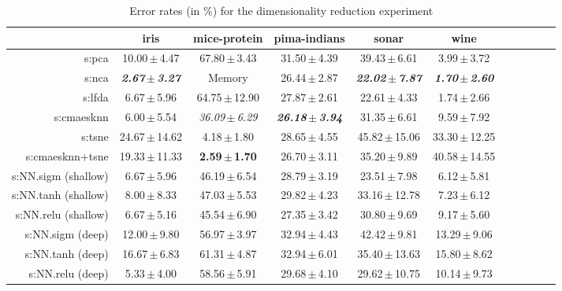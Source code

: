 \begin{table}[ht]
{\begin{tabular}{rcccccccccc}
\midrule
& \multicolumn{1}{c}{iris} & \multicolumn{1}{c}{mice-protein} & \multicolumn{1}{c}{pima-indians} & \multicolumn{1}{c}{sonar} & \multicolumn{1}{c}{wine} \\ 
\midrule
s:\ac{pca} & 10.00\,$\pm$\,4.47 & 67.80\,$\pm$\,3.43 & 31.50\,$\pm$\,4.39 & 39.43\,$\pm$\,6.61 & 3.99\,$\pm$\,3.72 \\
s:\ac{nca} & \emph{\textbf{2.67\,$\pm$\,3.27}} & Memory  & 26.44\,$\pm$\,2.87 & \emph{\textbf{22.02\,$\pm$\,7.87}} & \emph{\textbf{1.70\,$\pm$\,2.60}} \\
s:\ac{lfda} & 6.67\,$\pm$\,5.96 & 64.75\,$\pm$\,12.90 & 27.87\,$\pm$\,2.61 & 22.61\,$\pm$\,4.33 & 1.74\,$\pm$\,2.66 \\
s:\ac{cmaesknn} & 6.00\,$\pm$\,5.54 & \emph{36.09\,$\pm$\,6.29} & \emph{\textbf{26.18\,$\pm$\,3.94}} & 31.35\,$\pm$\,6.61 & 9.59\,$\pm$\,7.92 \\
s:\ac{tsne} & 24.67\,$\pm$\,14.62 & 4.18\,$\pm$\,1.80 & 28.65\,$\pm$\,4.55 & 45.82\,$\pm$\,15.06 & 33.30\,$\pm$\,12.25 \\
s:\ac{cmaesknn}+\ac{tsne} & 19.33\,$\pm$\,11.33 & \textbf{2.59\,$\pm$\,1.70} & 26.70\,$\pm$\,3.11 & 35.20\,$\pm$\,9.89 & 40.58\,$\pm$\,14.55 \\
s:NN.sigm (shallow) & 6.67\,$\pm$\,5.96 & 46.19\,$\pm$\,6.54 & 28.79\,$\pm$\,3.19 & 23.51\,$\pm$\,7.98 & 6.12\,$\pm$\,5.81 \\
s:NN.\ac{tanh} (shallow) & 8.00\,$\pm$\,8.33 & 47.03\,$\pm$\,5.53 & 29.82\,$\pm$\,4.23 & 33.16\,$\pm$\,12.78 & 7.23\,$\pm$\,6.12 \\
s:NN.\ac{relu} (shallow) & 6.67\,$\pm$\,5.16 & 45.54\,$\pm$\,6.90 & 27.35\,$\pm$\,3.42 & 30.80\,$\pm$\,9.69 & 9.17\,$\pm$\,5.60 \\
s:NN.sigm (deep) & 12.00\,$\pm$\,9.80 & 56.97\,$\pm$\,3.97 & 32.94\,$\pm$\,4.43 & 42.42\,$\pm$\,9.81 & 13.29\,$\pm$\,9.06 \\
s:NN.\ac{tanh} (deep) & 16.67\,$\pm$\,6.83 & 61.31\,$\pm$\,4.87 & 32.94\,$\pm$\,6.01 & 35.40\,$\pm$\,13.63 & 15.80\,$\pm$\,8.62 \\
s:NN.\ac{relu} (deep) & 5.33\,$\pm$\,4.00 & 58.56\,$\pm$\,5.91 & 29.68\,$\pm$\,4.10 & 29.62\,$\pm$\,10.75 & 10.14\,$\pm$\,9.73 \\


\bottomrule
\end{tabular}
}
\caption{Error rates (in \%) for the dimensionality reduction experiment} \label{tab:dim-error-rates}
\end{table}
